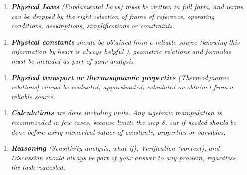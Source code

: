 \documentclass{article}
\begin{document}
\begin{enumerate}[resume]
\item \textit{\textbf{Physical Laws} (Fundamental Laws) must be written in full form, and terms can be dropped by the right selection of frame of reference, operating conditions, assumptions, simplifications or constraints.}
\end{enumerate}

\begin{enumerate}[resume]
\item \textit{\textbf{Physical constants} should be obtained from a reliable source (knowing this information by heart is always helpful ), geometric relations and formulae must be included as part of your analysis.}
\end{enumerate}

\begin{enumerate}[resume]
\item \textit{\textbf{Physical transport or thermodynamic properties} (Thermodynamic relations) should be evaluated, approximated, calculated or obtained from a reliable source.}
\end{enumerate}

\begin{enumerate}[resume]
\item \textit{\textbf{Calculations} are done including units. Any algebraic manipulation is recommended in few cases, because limits the step 8, but if needed should be done before using numerical values of constants, properties or variables.}
\end{enumerate}

\begin{enumerate}[resume]
\item \textit{\textbf{Reasoning} (Sensitivity analysis, what if), Verification (context), and Discussion should always be part of your answer to any problem, regardless the task requested.}
\end{enumerate}

\printbibliography[title={References}]
\end{document}
